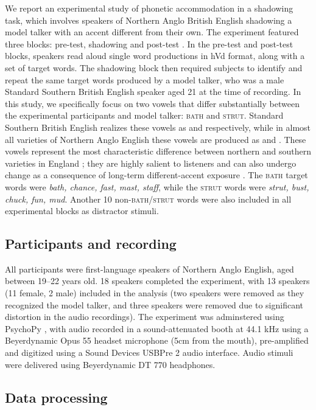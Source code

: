 \documentclass[10pt,letterpaper]{article}
\begin{document}
We report an experimental study of phonetic accommodation in a shadowing task, which involves speakers of Northern Anglo British English shadowing a model talker with an accent different from their own. The experiment featured three blocks: pre-test, shadowing and post-test \citep{babel2010, goldinger1998}. In the pre-test and post-test blocks, speakers read aloud single word productions in hVd format, along with a set of target words. The shadowing block then required subjects to identify and repeat the same target words produced by a model talker, who was a male Standard Southern British English speaker aged 21 at the time of recording. In this study, we specifically focus on two vowels that differ substantially between the experimental participants and model talker: \textsc{bath} and \textsc{strut}. Standard Southern British English realizes these vowels as \textipa{[A]} and \textipa{[2]} respectively, while in almost all varieties of Northern Anglo English these vowels are produced as \textipa{[a]} and \textipa{[U]}. These vowels represent the most characteristic difference between northern and southern varieties in England \citep{wells1982}; they are highly salient to listeners and can also undergo change as a consequence of long-term different-accent exposure \citep{evans-iverson2007}. The \textsc{bath} target words were \textit{bath, chance, fast, mast, staff}, while the \textsc{strut} words were \textit{strut, bust, chuck, fun, mud}. Another 10 non-\textsc{bath/strut} words were also included in all experimental blocks as distractor stimuli.

\subsection{Participants and recording}

All participants were first-language speakers of Northern Anglo English, aged between 19--22 years old. 18 speakers completed the experiment, with 13 speakers (11 female, 2 male) included in the analysis (two speakers were removed as they recognized the model talker, and three speakers were removed due to significant distortion in the audio recordings). The experiment was adminstered using PsychoPy \citep{psychopy2019}, with audio recorded in a sound-attenuated booth at 44.1 kHz using a Beyerdynamic Opus 55 headset microphone (5cm from the mouth), pre-amplified and digitized using a Sound Devices USBPre 2 audio interface. Audio stimuli were delivered using Beyerdynamic DT 770 headphones.

\subsection{Data processing}
\end{document}
